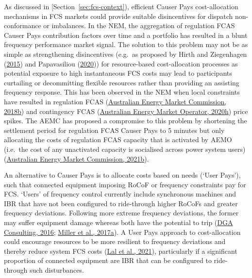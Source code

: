 \documentclass[12pt,a4paper,]{report}
\begin{document}
As discussed in {[}Section~\ref{sec:fcs-context}), efficient Causer Pays
cost-allocation mechanisms in FCS markets could provide suitable
disincentives for dispatch non-conformance or imbalances. In the NEM,
the aggregation of regulation FCAS Causer Pays contribution factors over
time and a portfolio has resulted in a blunt frequency performance
market signal. The solution to this problem may not be as simple as
strengthening disincentives (e.g.~as proposed by Hirth and Ziegenhagen
(\protect\hyperlink{ref-hirthBalancingPowerVariable2015}{2015}) and
Papavasiliou
(\protect\hyperlink{ref-papavasiliouScarcityPricingMissing2020}{2020}))
for resource-based cost-allocation processes as potential exposure to
high instantaneous FCS costs may lead to participants curtailing or
decommitting flexible resources rather than providing an assisting
frequency response. This has been observed in the NEM when local
constraints have resulted in regulation FCAS
(\protect\hyperlink{ref-australianenergymarketcommissionFrequencyControlFrameworks2018}{Australian
Energy Market Commission, 2018b}) and contingency FCAS
(\protect\hyperlink{ref-australianenergymarketoperatorQuarterlyEnergyDynamics2020}{Australian
Energy Market Operator, 2020h}) price spikes. The AEMC has proposed a
compromise to this problem by shortening the settlement period for
regulation FCAS Causer Pays to 5 minutes but only allocating the costs
of regulation FCAS capacity that is activated by AEMO (i.e.~the cost of
any unactivated capacity is socialised across power system users)
(\protect\hyperlink{ref-australianenergymarketcommissionPrimaryFrequencyResponse2021}{Australian
Energy Market Commission, 2021b}).

An alternative to Causer Pays is to allocate costs based on needs (`User
Pays'), such that connected equipment imposing RoCoF or frequency
constraints pay for FCS. `Users' of frequency control currently include
synchronous machines and IBR that have not been configured to
ride-through higher RoCoFs and greater frequency deviations. Following
more extreme frequency deviations, the former may suffer equipment
damage whereas both have the potential to trip
(\protect\hyperlink{ref-dgaconsultingInternationalReviewFrequency2016}{DGA
Consulting, 2016};
\protect\hyperlink{ref-millerAdvisoryEquipmentLimits2017}{Miller et al.,
2017a}). A User Pays approach to cost-allocation could encourage
resources to be more resilient to frequency deviations and thereby
reduce system FCS costs
(\protect\hyperlink{ref-lalEssentialSystemServices2021}{Lal et al.,
2021}), particularly if a significant proportion of connected equipment
are IBR that can be configured to ride-through such disturbances.
\end{document}
